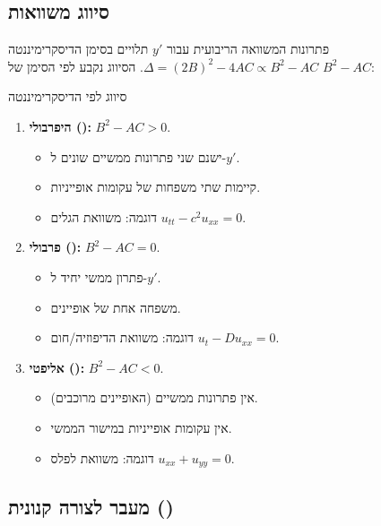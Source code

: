\subsection{סיווג משוואות}

פתרונות המשוואה הריבועית עבור $y'$ תלויים בסימן הדיסקרימיננטה $\Delta = (2B)^2 - 4AC \propto B^2 - AC$.
הסיווג נקבע לפי הסימן של $B^2 - AC$:

\begin{definitionbox}{סיווג לפי הדיסקרימיננטה}
    \begin{enumerate}
        \item \textbf{היפרבולי ():} $B^2 - AC > 0$.
        \begin{itemize}
            \item ישנם שני פתרונות ממשיים שונים ל-$y'$.
            \item קיימות שתי משפחות של עקומות אופייניות.
            \item דוגמה: משוואת הגלים $u_{tt} - c^2 u_{xx} = 0$.
        \end{itemize}
        
        \item \textbf{פרבולי ():} $B^2 - AC = 0$.
        \begin{itemize}
            \item פתרון ממשי יחיד ל-$y'$.
            \item משפחה אחת של אופיינים.
            \item דוגמה: משוואת הדיפוזיה/חום $u_t - D u_{xx} = 0$.
        \end{itemize}
        
        \item \textbf{אליפטי ():} $B^2 - AC < 0$.
        \begin{itemize}
            \item אין פתרונות ממשיים (האופיינים מרוכבים).
            \item אין עקומות אופייניות במישור הממשי.
            \item דוגמה: משוואת לפלס $u_{xx} + u_{yy} = 0$.
        \end{itemize}
    \end{enumerate}
\end{definitionbox}

\subsection{מעבר לצורה קנונית ()}

